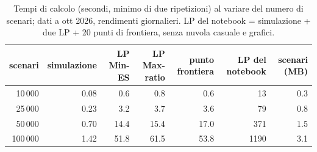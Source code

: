 \begin{table}[htbp]\centering\footnotesize\setlength{\tabcolsep}{4pt}
\caption{Tempi di calcolo (secondi, minimo di due ripetizioni) al variare del numero di scenari; dati a ott 2026, rendimenti giornalieri. LP del notebook = simulazione + due LP + 20 punti di frontiera, senza nuvola casuale e grafici.}\label{tab:bench}
\begin{tabular}{rrrrrrr}\toprule
scenari & simulazione & LP Min-ES & LP Max-ratio & punto frontiera & LP del notebook & scenari (MB) \\ \midrule
10\,000 & 0.08 & 0.6 & 0.8 & 0.6 & 13 & 0.3 \\
25\,000 & 0.23 & 3.2 & 3.7 & 3.6 & 79 & 0.8 \\
50\,000 & 0.70 & 14.4 & 15.4 & 17.0 & 371 & 1.5 \\
100\,000 & 1.42 & 51.8 & 61.5 & 53.8 & 1190 & 3.1 \\
\bottomrule\end{tabular}\end{table}
